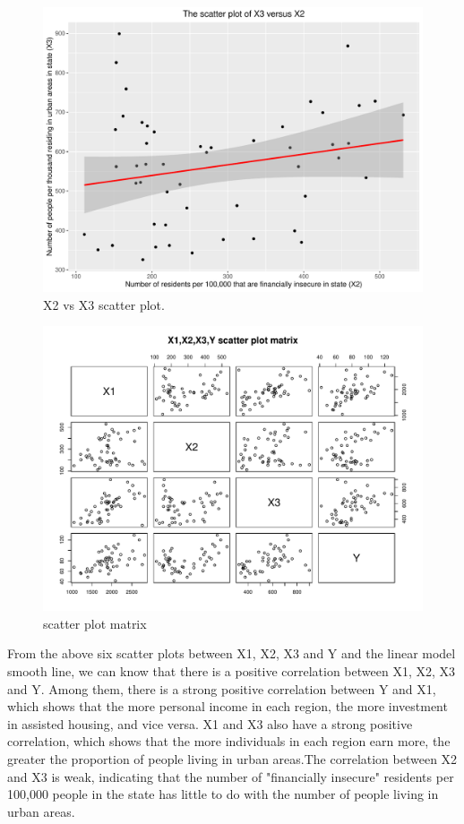 \documentclass[12pt,letterpaper]{article}
\begin{document}
\begin{itemize}
\begin{figure}[h!]
\end{figure}
\begin{figure}[h!]\centering
	\caption{\footnotesize X2 vs X3 scatter plot.}
	\label{fig:plot_X2_vs_X3}
	\includegraphics[width=.75\textwidth]{X2_vs_X3_scatterplot.pdf}
\end{figure}
\begin{figure}[h!]\centering
	\caption{\footnotesize  scatter plot matrix}
	\label{fig:matrix_X1_X2_X3_X4_Y}
	\includegraphics[width=.75\textwidth]{scatterplot_matrix.pdf}
\end{figure}
\vspace{10cm}
 From the above six scatter plots between X1, X2, X3 and Y and the linear model smooth line, we can know that there is a positive correlation between X1, X2, X3 and Y. Among them, there is a strong positive correlation between Y and X1, which shows that the more personal income in each region, the more investment in assisted housing, and vice versa. X1 and X3 also have a strong positive correlation, which shows that the more individuals in each region earn more, the greater the proportion of people living in urban areas.The correlation between X2 and X3 is weak, indicating that the number of "financially insecure" residents per 100,000 people in the state has little to do with the number of people living in urban areas. \\


\end{itemize}
\end{document}
